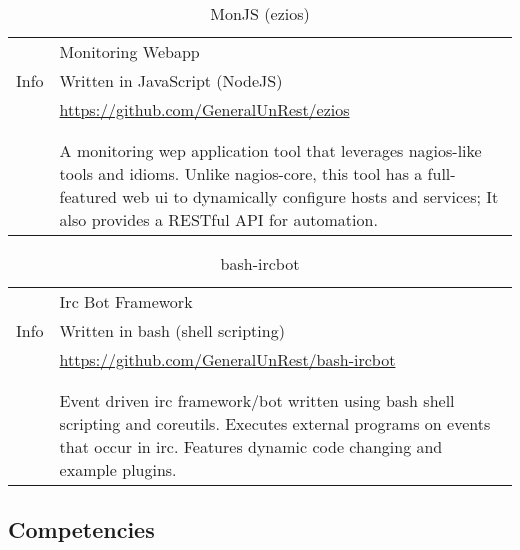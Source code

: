 \documentclass[letterpaper,]{article}
\begin{document}
\begin{table}[!ht]
\centering
    \caption{MonJS (ezios)}
    \begin{tabularx}{\textwidth}{r|X}
        \multirow{3}{*}{Info} & Monitoring Webapp \\
                              & Written in JavaScript (NodeJS) \\
                              & \href{https://github.com/GeneralUnRest/ezios}{https://github.com/GeneralUnRest/ezios} \\
        & \\
        \begin{tabular}{@{}l@{}}
            Description \\
        \end{tabular}
        & A monitoring wep application tool that leverages nagios-like 
        tools and idioms. Unlike nagios-core, this tool has a full-featured 
        web ui to dynamically configure hosts and services; It also provides
        a RESTful API for automation.
    \end{tabularx}
\end{table}

\begin{table}[!ht]
\centering
    \caption{bash-ircbot}
    \begin{tabularx}{\textwidth}{r|X}
        \multirow{3}{*}{Info} & Irc Bot Framework \\
                              & Written in bash (shell scripting) \\
                              & \href{https://github.com/GeneralUnRest/bash-ircbot}{https://github.com/GeneralUnRest/bash-ircbot} \\
        & \\
        \begin{tabular}{@{}l@{}}
            Description \\
        \end{tabular}
        & Event driven irc framework/bot 
        written using bash shell scripting and coreutils.
        Executes external programs on events that occur in irc.
        Features dynamic code changing and example plugins. 
    \end{tabularx}
\end{table}

\subsection{Competencies}\label{competencies}
\end{document}
